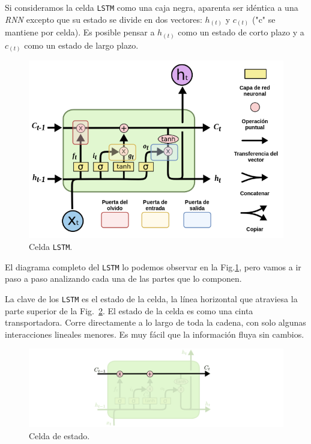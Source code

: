 \documentclass[a4paper,12pt]{article}
\begin{document}
Si consideramos la celda \texttt{LSTM} como una caja negra, aparenta ser idéntica a una \textit{RNN} excepto que su estado se divide en dos vectores: $h_{(t)}$ y $c_{(t)}$ ("c" se mantiene por celda). Es posible pensar a $h_{(t)}$ como un estado de corto plazo y a $c_{(t)}$ como un estado de largo plazo.

\begin{figure}[H]
	\begin{center}				
	\includegraphics[width=1\textwidth]{lstmcell5.png}
  	\caption{Celda \texttt{LSTM}.}
  	\label{fig:lstmcell}
  	\end{center}
\end{figure}

El diagrama completo del \texttt{LSTM} lo podemos observar en la Fig.\ref{fig:lstmcell}, pero vamos a ir paso a paso analizando cada una de las partes que lo componen.

La clave de los \texttt{LSTM} es el estado de la celda, la línea horizontal que atraviesa la parte superior de la Fig.~\ref{fig:lstm1}. El estado de la celda es como una cinta transportadora. Corre directamente a lo largo de toda la cadena, con solo algunas interacciones lineales menores. Es muy fácil que la información fluya sin cambios.

\begin{figure}[H]
	\begin{center}				
	\includegraphics[width=1\textwidth]{lstm1.png}
  	\caption{Celda de estado.}
  	\label{fig:lstm1}
  	\end{center}
\end{figure}
\end{document}
